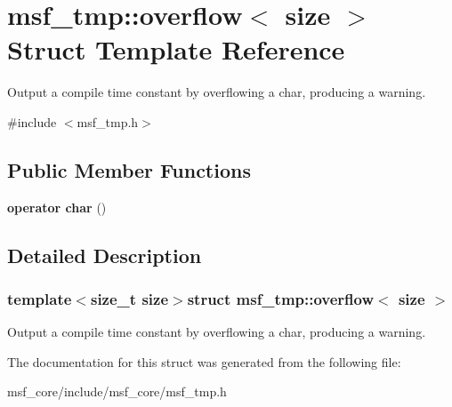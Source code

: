 \hypertarget{structmsf__tmp_1_1overflow}{\section{msf\-\_\-tmp\-:\-:overflow$<$ size $>$ Struct Template Reference}
\label{structmsf__tmp_1_1overflow}
}


Output a compile time constant by overflowing a char, producing a warning.  




{\ttfamily \#include $<$msf\-\_\-tmp.\-h$>$}

\subsection*{Public Member Functions}
\begin{DoxyCompactItemize}
\item 
\hypertarget{structmsf__tmp_1_1overflow_a4876303a7c2e84a69671b61e24ed2b8f}{{\bfseries operator char} ()}\label{structmsf__tmp_1_1overflow_a4876303a7c2e84a69671b61e24ed2b8f}

\end{DoxyCompactItemize}


\subsection{Detailed Description}
\subsubsection*{template$<$size\-\_\-t size$>$struct msf\-\_\-tmp\-::overflow$<$ size $>$}

Output a compile time constant by overflowing a char, producing a warning. 

The documentation for this struct was generated from the following file\-:\begin{DoxyCompactItemize}
\item 
msf\-\_\-core/include/msf\-\_\-core/msf\-\_\-tmp.\-h\end{DoxyCompactItemize}
